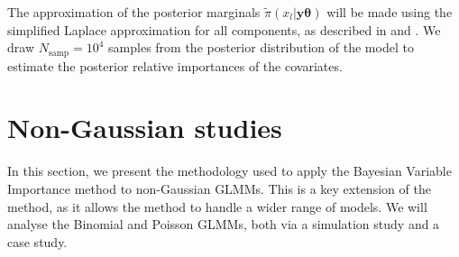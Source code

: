 The approximation of the posterior marginals $\tilde{\pi}(x_l \lvert \mathbf{y} \boldsymbol{\theta})$ will be made using the simplified Laplace approximation for all components, as described in  and . We draw $N_{\text{samp}}=10^4$ samples from the posterior distribution of the model to estimate the posterior relative importances of the covariates.

\section{Non-Gaussian studies}
In this section, we present the methodology used to apply the Bayesian Variable Importance method to non-Gaussian GLMMs. This is a key extension of the method, as it allows the method to handle a wider range of models. We will analyse the Binomial and Poisson GLMMs, both via a simulation study and a case study.

